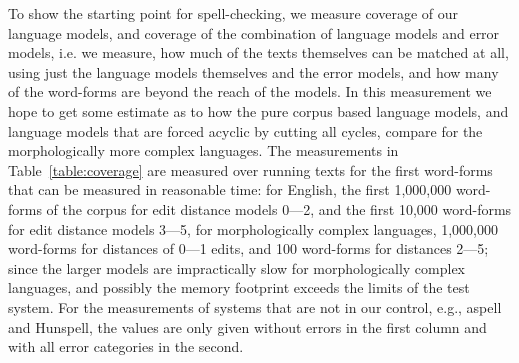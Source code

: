 \documentclass[a4paper,12pt]{article}
\begin{document}
To show the starting point for spell-checking, we measure coverage of our
language models, and coverage of the combination of language models and error
models, i.e. we measure, how much of the texts themselves can be matched at
all, using just the language models themselves and the error models, and how
many of the word-forms are beyond the reach of the models. In this measurement
we hope to get some estimate as to  how the pure corpus based language models,
and language models that are forced acyclic by cutting all cycles, compare for
the morphologically more complex languages.  The measurements in
Table~\ref{table:coverage} are measured over running texts for the first
word-forms that can be measured in reasonable time: for English, the first
1,000,000 word-forms of the corpus for edit distance models 0---2, and the
first 10,000 word-forms for edit distance models 3---5, for morphologically
complex languages, 1,000,000 word-forms for distances of 0---1 edits, and 100
word-forms for distances 2---5; since the larger models are impractically slow
for morphologically complex languages, and possibly the memory footprint
exceeds the limits of the test system. For the measurements of systems that are
not in our control, e.g., aspell and Hunspell, the values are only given
without errors in the first column and with all error categories in the second.
\end{document}
